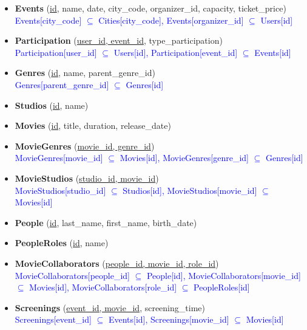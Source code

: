 \begin{itemize}[label={},left=0pt]
    \item \textbf{Events} (\underline{id}, name, date, city\_code, organizer\_id, capacity, ticket\_price) \\
    \textcolor{blue}{Events[city\_code] $\subseteq$ Cities[city\_code], Events[organizer\_id] $\subseteq$ Users[id]}
    \item \textbf{Participation} (\underline{user\_id, event\_id}, type\_participation) \\
    \textcolor{blue}{Participation[user\_id] $\subseteq$ Users[id], Participation[event\_id] $\subseteq$ Events[id]}
    
    \item \textbf{Genres} (\underline{id}, name, parent\_genre\_id) \\
    \textcolor{blue}{Genres[parent\_genre\_id] $\subseteq$ Genres[id]}

    \item \textbf{Studios} (\underline{id}, name)
    
    \item \textbf{Movies} (\underline{id}, title, duration, release\_date)
    \item \textbf{MovieGenres} (\underline{movie\_id, genre\_id}) \\
    \textcolor{blue}{MovieGenres[movie\_id] $\subseteq$ Movies[id], MovieGenres[genre\_id] $\subseteq$ Genres[id]}
    \item \textbf{MovieStudios} (\underline{studio\_id, movie\_id}) \\
    \textcolor{blue}{MovieStudios[studio\_id] $\subseteq$ Studios[id], MovieStudios[movie\_id] $\subseteq$ Movies[id]}

    \item \textbf{People} (\underline{id}, last\_name, first\_name, birth\_date)
    \item \textbf{PeopleRoles} (\underline{id}, name)
    \item \textbf{MovieCollaborators} (\underline{people\_id, movie\_id, role\_id}) \\
    \textcolor{blue}{MovieCollaborators[people\_id] $\subseteq$ People[id], MovieCollaborators[movie\_id] $\subseteq$ Movies[id], MovieCollaborators[role\_id] $\subseteq$ PeopleRoles[id]}
    
    \item \textbf{Screenings} (\underline{event\_id, movie\_id}, screening\_time) \\
    \textcolor{blue}{Screenings[event\_id] $\subseteq$ Events[id], Screenings[movie\_id] $\subseteq$ Movies[id]}


\end{itemize}

